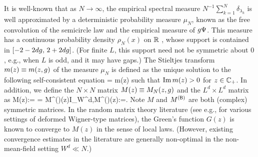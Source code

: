 It is well-known that as $N\to \infty$, the empirical spectral measure $N^{-1}\sum_{k=1}^N \delta_{\lambda_k}$ is well approximated by a deterministic probability measure $\mu_{N}$, known as the free convolution of the semicircle law and the empirical measure of $g\Psi$. This measure has a continuous probability density $\rho_N(x)$ on $\mathbb{R}$ \cite{Biane}, whose support is contained in $[-2-2dg,\, 2+2dg]$. (For finite $L$, this support need not be symmetric about $0$, e.g., when $L$ is odd, and it may have gaps.)
The Stieltjes transform $m(z)\equiv m(z,g)$ of the measure $\mu_{N}$ is defined as the unique solution to the following self-consistent equation
\be\label{self_m}
\tr {} = m(z)
\ee
such that $\operatorname{{\mathrm{Im}}} m(z)>0$ for $z\in \mathbb C_+$. 
In addition, we define the $N\times N$ matrix $M(z)\equiv M_N(z,g)$ and the $L^d\times L^d$ matrix  as
\be\label{def_G0}
M(z):=  = M^{(\sB)}(z)\otimes I_{W^d},\quad M^{(\sB)}(z):=.
 \ee
Note $M$ and $M^{({\mathsf{B}})}$ are both (complex) symmetric matrices. In the random matrix theory literature (see e.g., \cite{LeeSchSteYau2015,knowles2017anisotropic,He2018,AEK_PTRF,EKS_Forum} for various settings of deformed Wigner-type matrices), the Green's function $G(z)$ is known to converge to $M(z)$ in the sense of local laws. %
(However, existing convergence estimates in the literature are generally non-optimal in the non-mean-field setting $W^d\ll N$.) 




